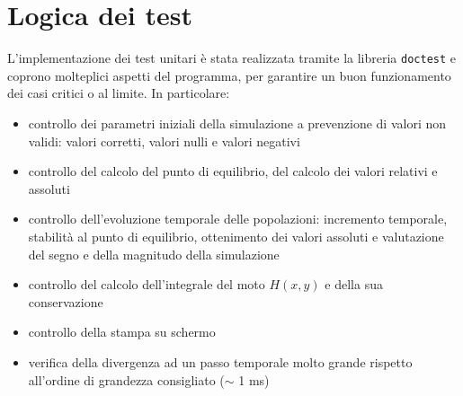 \section{Logica dei test}

L'implementazione dei test unitari è stata realizzata tramite la libreria \verb|doctest| e coprono molteplici aspetti del programma, per garantire un buon funzionamento dei casi critici o al limite.
In particolare:
\begin{itemize}
    \item controllo dei parametri iniziali della simulazione a prevenzione di valori non validi: valori corretti, valori nulli e valori negativi
    \item controllo del calcolo del punto di equilibrio, del calcolo dei valori relativi e assoluti
    \item controllo dell'evoluzione temporale delle popolazioni: incremento temporale, stabilità al punto di equilibrio, ottenimento dei valori assoluti e valutazione del segno e della magnitudo della simulazione
    \item controllo del calcolo dell'integrale del moto $H(x,y)$ e della sua conservazione
    \item controllo della stampa su schermo
    \item verifica della divergenza ad un passo temporale molto grande rispetto all'ordine di grandezza consigliato ($\sim$ 1 ms)
\end{itemize}
